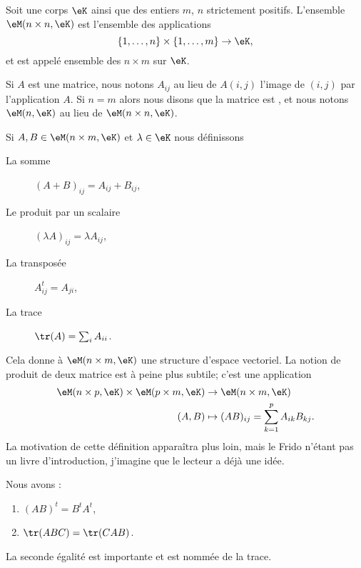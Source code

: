 \begin{definition}
    Soit une corps \( \eK\) ainsi que des entiers \( m\), \( n\) strictement positifs. L'ensemble \( \eM(n\times n,\eK)\) est l'ensemble des applications
    \begin{equation}
        \{ 1,\ldots, n \}\times \{ 1,\ldots, m \}\to \eK,
    \end{equation}
    et est appelé ensemble des  \(n\times m\) sur \( \eK\).
\end{definition}
Si \( A\) est une matrice, nous notons \( A_{ij}\) au lieu de \( A(i,j)\) l'image de \( (i,j)\) par l'application \( A\). Si \( n=m\) alors nous disons que la matrice est , et nous notons \( \eM(n,\eK)\) au lieu de \( \eM(n\times n,\eK)\).

Si \( A,B\in \eM(n\times m,\eK)\) et \( \lambda\in \eK\)  nous définissons
\begin{description}
    \item[La somme] \( (A+B)_{ij}=A_{ij}+B_{ij}\),
    \item[Le produit par un scalaire] \( (\lambda A)_{ij}=\lambda A_{ij}\),
    \item[La transposée] \( A^t_{ij}=A_{ji}\),
    \item[La trace] \( \tr(A)=\sum_iA_{ii}\).
\end{description}
Cela donne à \( \eM(n\times m,\eK)\) une structure d'espace vectoriel. La notion de produit de deux matrice est à peine plus subtile; c'est une application
\begin{equation}
    \begin{aligned}
         \eM(n\times p,\eK)\times \eM(p\times m,\eK)&\to \eM(n\times m,\eK) \\
         (A,B)&\mapsto (AB)_{ij}=\sum_{k=1}^pA_{ik}B_{kj}. 
    \end{aligned}
\end{equation}
La motivation de cette définition apparaîtra plus loin, mais le Frido n'étant pas un livre d'introduction, j'imagine que le lecteur a déjà une idée.

\begin{lemma}
    Nous avons :
    \begin{enumerate}
        \item
            \( (AB)^t=B^tA^t\),
        \item
            \( \tr(ABC)=\tr(CAB)\).
    \end{enumerate}
    La seconde égalité est importante et est nommée  de la trace.
\end{lemma}

